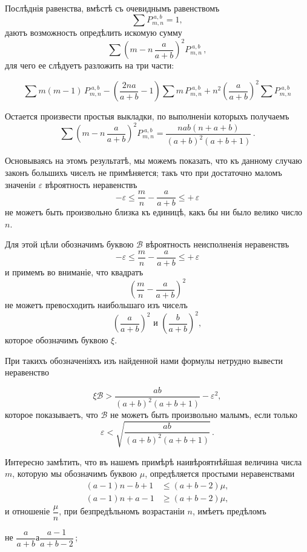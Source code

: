 \documentclass[12pt]{article}
\begin{document}
Послѣднія равенства, вмѣстѣ съ очевиднымъ равенствомъ
\[
\sum P^{\;a,b}_{m,n} = 1,
\]
даютъ возможность опредѣлить искомую сумму
\[
\sum \!\left(m - n\,\frac{a}{a+b}\right)^{\!2} P^{\;a,b}_{m,n}\,,
\]
для чего ее слѣдуетъ разложить на три части:


\[
\sum m(m-1)\,P^{\;a,b}_{m,n} - \left(\frac{2na}{a+b} - 1\right)\!\sum m\,P^{\;a,b}_{m,n}
+ n^2 \!\left(\frac{a}{a+b}\right)^{\!2}\!\sum P^{\;a,b}_{m,n}
\]

Остается произвести простыя выкладки, по выполненіи которыхъ получаемъ
\[
\sum \!\left(m - n\,\frac{a}{a+b}\right)^{\!2} P^{\;a,b}_{m,n} = \frac{nab(n + a + b)}{(a+b)^2(a+b+1)}\,.
\]

Основываясь на этомъ результатѣ, мы можемъ показать, что къ данному случаю законъ большихъ чиселъ не примѣняется; такъ что при достаточно маломъ значеніи $\varepsilon$ вѣроятность неравенствъ
\[
-\varepsilon \leq \frac{m}{n} - \frac{a}{a+b} \leq +\,\varepsilon
\]
не можетъ быть произвольно близка къ единицѣ, какъ бы ни было велико число $n$.

Для этой цѣли обозначимъ буквою $\mathcal{B}$ вѣроятность неисполненія неравенствъ
\[
-\varepsilon \leq \frac{m}{n} - \frac{a}{a+b} \leq +\,\varepsilon
\]
и примемъ во вниманіе, что квадратъ
\[
\left(\frac{m}{n} - \frac{a}{a+b}\right)^{\!2}
\]
не можетъ превосходить наибольшаго изъ чиселъ
\[
\left(\frac{a}{a+b}\right)^{\!2} \text{ и } \left(\frac{b}{a+b}\right)^{\!2},
\]
которое обозначимъ буквою $\xi$.

При такихъ обозначеніяхъ изъ найденной нами формулы нетрудно вывести неравенство


\[
\xi\mathcal{B} > \frac{ab}{(a+b)^2(a+b+1)} - \varepsilon^2,
\]
которое показываетъ, что $\mathcal{B}$ не можетъ быть произвольно малымъ, если только
\[
\varepsilon < \sqrt{\frac{ab}{(a+b)^2(a+b+1)}}\,.
\]

Интересно замѣтить, что въ нашемъ примѣрѣ наивѣроятнѣйшая величина числа $m$, которую мы обозначимъ буквою $\mu$, опредѣляется простыми неравенствами
\begin{align*}
(a - 1)n - b + 1 &\leq (a + b - 2)\mu, \\
(a - 1)n + a - 1 &\geq (a + b - 2)\mu,
\end{align*}
и отношеніе $\dfrac{\mu}{n}$, при безпредѣльномъ возрастаніи $n$, имѣетъ предѣломъ

не $\dfrac{a}{a+b}$\quad а\quad $\dfrac{a - 1}{a + b - 2}$\,;
\end{document}
